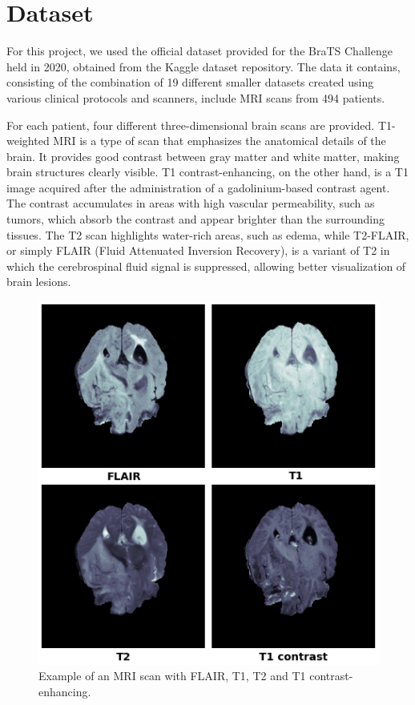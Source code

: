 \documentclass[10pt,twocolumn,letterpaper]{article}
\begin{document}

\section{Dataset}

For this project, we used the official dataset\cite{BraTSdataset} provided for the BraTS Challenge held in 2020, obtained from the Kaggle dataset repository. The data it contains, consisting of the combination of 19 different smaller datasets created using various clinical protocols and scanners, include MRI scans from 494 patients.

For each patient, four different three-dimensional brain scans are provided. T1-weighted MRI is a type of scan that emphasizes the anatomical details of the brain. It provides good contrast between gray matter and white matter, making brain structures clearly visible. T1 contrast-enhancing, on the other hand, is a T1 image acquired after the administration of a gadolinium-based contrast agent. The contrast accumulates in areas with high vascular permeability, such as tumors, which absorb the contrast and appear brighter than the surrounding tissues. The T2 scan highlights water-rich areas, such as edema, while T2-FLAIR, or simply FLAIR (Fluid Attenuated Inversion Recovery), is a variant of T2 in which the cerebrospinal fluid signal is suppressed, allowing better visualization of brain lesions.

\begin{figure}[H]
    \centering
    \includegraphics[width=0.55\linewidth]{img/example_MRI.png}
    \caption{Example of an MRI scan with FLAIR, T1, T2 and T1 contrast-enhancing.}
\end{figure}
\end{document}

